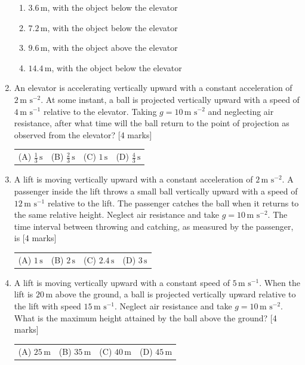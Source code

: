 \documentclass[11pt,a4paper]{article}
\begin{document}
\begin{enumerate}[resume]
\begin{enumerate}[label=(\Alph*),leftmargin=1.6em,itemsep=1pt]\item \(3.6\,\mathrm{m}\), with the object below the elevator \item \(7.2\,\mathrm{m}\), with the object below the elevator \item \(9.6\,\mathrm{m}\), with the object above the elevator \item \(14.4\,\mathrm{m}\), with the object below the elevator\end{enumerate}
\item An elevator is accelerating vertically upward with a constant acceleration of $2\,\text{m s}^{-2}$. At some instant, a ball is projected vertically upward with a speed of $4\,\text{m s}^{-1}$ relative to the elevator. Taking $g=10\,\text{m s}^{-2}$ and neglecting air resistance, after what time will the ball return to the point of projection as observed from the elevator? \hfill [4 marks]
{\renewcommand{\arraystretch}{1.8}
\begin{tabularx}{\linewidth}{X X X X}
(A) \quad $\frac{1}{3}\,\text{s}$ & (B) \quad $\frac{2}{3}\,\text{s}$ & (C) \quad $1\,\text{s}$ & (D) \quad $\frac{4}{3}\,\text{s}$ \\[10pt]
\end{tabularx}}
\item A lift is moving vertically upward with a constant acceleration of $2\,\text{m s}^{-2}$. A passenger inside the lift throws a small ball vertically upward with a speed of $12\,\text{m s}^{-1}$ relative to the lift. The passenger catches the ball when it returns to the same relative height. Neglect air resistance and take $g=10\,\text{m s}^{-2}$. The time interval between throwing and catching, as measured by the passenger, is \hfill [4 marks]
{\renewcommand{\arraystretch}{1.8}
\begin{tabularx}{\linewidth}{X X X X}
(A) \quad $1\,\text{s}$ & (B) \quad $2\,\text{s}$ & (C) \quad $2.4\,\text{s}$ & (D) \quad $3\,\text{s}$ \\[10pt]
\end{tabularx}}
\item A lift is moving vertically upward with a constant speed of \(5\,\text{m s}^{-1}\). When the lift is \(20\,\text{m}\) above the ground, a ball is projected vertically upward relative to the lift with speed \(15\,\text{m s}^{-1}\). Neglect air resistance and take \(g=10\,\text{m s}^{-2}\). What is the maximum height attained by the ball above the ground? \hfill [4 marks]
{\renewcommand{\arraystretch}{1.8}
\begin{tabularx}{\linewidth}{X X X X}
(A) \quad \(25\,\text{m}\) & (B) \quad \(35\,\text{m}\) & (C) \quad \(40\,\text{m}\) & (D) \quad \(45\,\text{m}\) \\[10pt]
\end{tabularx}}
\end{enumerate}
\end{document}

